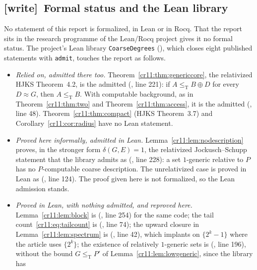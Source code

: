 \documentclass[11pt,letterpaper]{article}
\theoremstyle{plain}
\theoremstyle{definition}
\theoremstyle{remark}
\numberwithin{equation}{section}
\newcommand{\leT}{\leq_{\mathrm T}}
\newcommand{\join}{\mathbin{\oplus}}
\newcommand{\wtag}{\textup{[write]}}
\begin{document}
\subsection{\wtag\ Formal status and the Lean library}\label{cr11:sec:wformal}

No statement of this report is formalized, in Lean or in Rocq. That the
report sits in the research programme of the Lean/Rocq project
 gives it no formal status. The
project's Lean library \texttt{CoarseDegrees}
(), which closes eight
published statements with \texttt{admit}, touches the report as follows.

\begin{itemize}
\item \emph{Relied on, admitted there too.}
Theorem~\ref{cr11:thm:genericcore}, the relativized HJKS Theorem~4.2, is
the admitted  (, line 221):
if $A\leT B\join D$ for every $D\approx G$, then $A\leT B$. With computable
background, as in Theorem~\ref{cr11:thm:two} and
Theorem~\ref{cr11:thm:access}, it is the admitted
 (, line 48).
Theorem~\ref{cr11:thm:compact} (HJKS Theorem~3.7) and
Corollary~\ref{cr11:cor:radius} have no Lean statement.
\item \emph{Proved here informally, admitted in Lean.}
Lemma~\ref{cr11:lem:nodescription} proves, in the stronger form
$\delta(G,E)=1$, the relativized Jockusch--Schupp statement that the
library admits as 
(, line 228): a set $1$-generic relative to $P$ has no
$P$-computable coarse description. The unrelativized case is proved in
Lean as 
(, line 124). The proof given here is not
formalized, so the Lean admission stands.
\item \emph{Proved in Lean, with nothing admitted, and reproved here.}
Lemma~\ref{cr11:lem:block} is 
(, line 254) for the same code; the tail
count~\eqref{cr11:eq:tailcount} is 
(, line 74); the upward closure in
Lemma~\ref{cr11:lem:spectrum} is 
(, line 42), which implants on $\{2^k-1\}$ where the
article uses $\{2^k\}$; the existence of relatively $1$-generic sets is
 (, line 196), without the
bound $G\leT P'$ of Lemma~\ref{cr11:lem:lowgeneric}, since the library has

\end{itemize}
\end{document}
